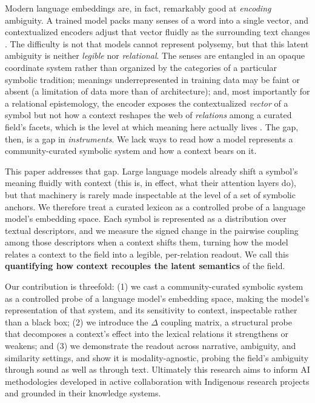 \documentclass[final,creativeai]{article}
\begin{document}
Modern language embeddings are, in fact, remarkably good at \emph{encoding} ambiguity. A trained model packs many senses of a word into a single vector, and contextualized encoders adjust that vector fluidly as the surrounding text changes \cite{haber_polysemyevidence_2024, loureiro_analysis_2021}. The difficulty is not that models cannot represent polysemy, but that this latent ambiguity is neither \emph{legible} nor \emph{relational}. The senses are entangled in an opaque coordinate system rather than organized by the categories of a particular symbolic tradition; meanings underrepresented in training data may be faint or absent (a limitation of data more than of architecture); and, most importantly for a relational epistemology, the encoder exposes the contextualized \emph{vector} of a symbol but not how a context reshapes the web of \emph{relations} among a curated field's facets, which is the level at which meaning here actually lives \cite{ferrari_identification_2018}. The gap, then, is a gap in \emph{instruments}. We lack ways to read how a model represents a community-curated symbolic system and how a context bears on it.

This paper addresses that gap. Large language models already shift a symbol's meaning fluidly with context (this is, in effect, what their attention layers do), but that machinery is rarely made inspectable at the level of a set of symbolic anchors. We therefore treat a curated lexicon as a controlled probe of a language model's embedding space. Each symbol is represented as a distribution over textual descriptors, and we measure the signed change in the pairwise coupling among those descriptors when a context shifts them, turning how the model relates a context to the field into a legible, per-relation readout. We call this \textbf{quantifying how context recouples the latent semantics} of the field.

Our contribution is threefold: (1) we cast a community-curated symbolic system as a controlled probe of a language model's embedding space, making the model's representation of that system, and its sensitivity to context, inspectable rather than a black box; (2) we introduce the $\Delta$ coupling matrix, a structural probe that decomposes a context's effect into the lexical relations it strengthens or weakens; and (3) we demonstrate the readout across narrative, ambiguity, and similarity settings, and show it is modality-agnostic, probing the field's ambiguity through sound as well as through text. Ultimately this research aims to inform AI methodologies developed in active collaboration with Indigenous research projects and grounded in their knowledge systems.
\end{document}
